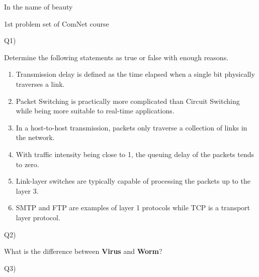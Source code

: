 \documentclass[10pt,letterpaper]{article}
\begin{document}
\Large
\begin{center}
In the name of beauty

1st problem set of ComNet course

\hrulefill
\end{center}
Q1)

Determine the following statements as true or false with enough reasons.
\begin{enumerate}[label=\alph*-]
\item
Transmission delay is defined as the time elapsed when a single bit physically traverses a link.
\item
Packet Switching is practically more complicated than Circuit Switching while being more suitable to real-time applications.
\item
In a host-to-host transmission, packets only traverse a collection of links in the network.
\item
With traffic intensity being close to 1, the queuing delay of the packets tends to zero.
\item
Link-layer switches are typically capable of processing the packets up to the layer 3.
\item
SMTP and FTP are examples of layer 1 protocols while TCP is a transport layer protocol.
\end{enumerate}
Q2)

What is the difference between \textbf{Virus} and \textbf{Worm}?

Q3)
\end{document}
